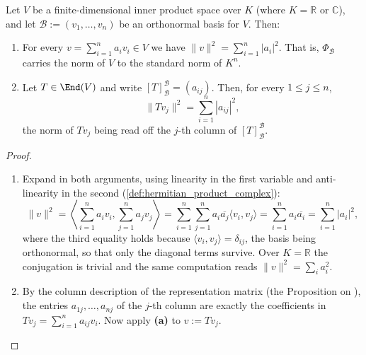 \begin{ailemma}
\label{ailem:norm_in_orthonormal_basis}
Let $V$ be a finite-di\-men\-sional inner product space over $K$ (where $K = \mathbb{R}$ or $\mathbb{C}$), and let $\mathcal{B} := (v_1, \dots, v_n)$ be an orthonormal basis for $V$. Then:
\begin{enumerate}[label=\textbf{(\alph*)}]
    \item For every $v = \sum_{i=1}^n a_i v_i \in V$ we have $\|v\|^2 = \sum_{i=1}^n |a_i|^2$. That is, $\Phi_{\mathcal{B}}$ carries the norm of $V$ to the standard norm of $K^n$.
    \item Let $T \in \End(V)$ and write $[T]_{\mathcal{B}}^{\mathcal{B}} = (a_{ij})$. Then, for every $1 \leq j \leq n$,
    \[
        \|T v_j\|^2 = \sum_{i=1}^n |a_{ij}|^2,
    \]
    the norm of $T v_j$ being read off the $j$-th column of $[T]_{\mathcal{B}}^{\mathcal{B}}$.
\end{enumerate}
\end{ailemma}

\begin{proof}
\begin{enumerate}[label=\textbf{(\alph*)}]
    \item Expand in both arguments, using linearity in the first variable and anti-linearity in the second (\cref{def:hermitian_product_complex}):
    \[
        \|v\|^2 = \left\langle \sum_{i=1}^n a_i v_i, \sum_{j=1}^n a_j v_j \right\rangle = \sum_{i=1}^n \sum_{j=1}^n a_i \overline{a_j} \langle v_i, v_j \rangle = \sum_{i=1}^n a_i \overline{a_i} = \sum_{i=1}^n |a_i|^2,
    \]
    where the third equality holds because $\langle v_i, v_j \rangle = \delta_{ij}$, the basis being orthonormal, so that only the diagonal terms survive. Over $K = \mathbb{R}$ the conjugation is trivial and the same computation reads $\|v\|^2 = \sum_i a_i^2$.

    \item By the column description of the representation matrix (the Proposition on ), the entries $a_{1j}, \dots, a_{nj}$ of the $j$-th column are exactly the coefficients in $T v_j = \sum_{i=1}^n a_{ij} v_i$. Now apply \textbf{(a)} to $v := T v_j$.
\end{enumerate}
\end{proof}

